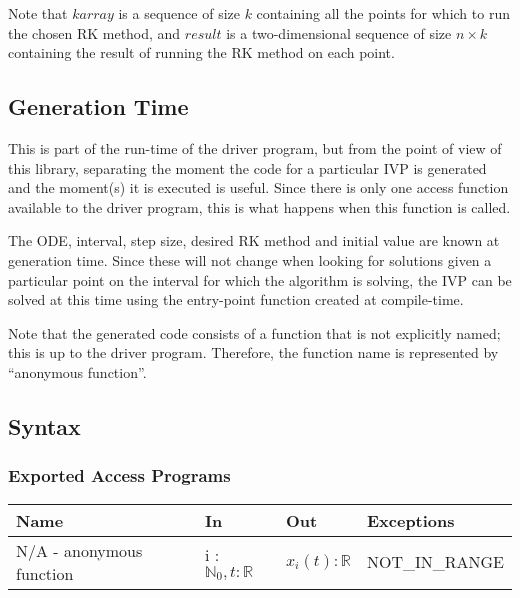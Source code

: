 \documentclass[12pt, titlepage]{article}
\begin{document}
Note that $karray$ is a sequence of size $k$ containing all the points for 
which to run the chosen RK method, and $result$ is a two-dimensional 
sequence of size $n \times k$ containing the result of running the RK method on 
each point.

\subsection{Generation Time}\label{ssec:generation-time}
This is part of the run-time of the driver program, but from the point of view 
of this library, separating the moment the code for a particular IVP is 
generated and the moment(s) it is executed is useful. Since there is only one 
access function available to the driver program, this is what happens when this 
function is called.

The ODE, interval, step size, desired RK method and initial value are known at 
generation time. 
Since these will not change when looking for solutions given a particular point 
on the interval for which the algorithm is solving, the IVP can be solved at 
this time using the entry-point function created at compile-time.

Note that the generated code consists of a function that is not explicitly 
named; this is up to the driver program. Therefore, the function name is 
represented by ``anonymous function''.
\subsection{Syntax}

\subsubsection{Exported Access Programs}

\begin{center}
  \begin{tabular}{p{5cm} p{3cm} p{3cm} p{3cm}}
    \hline
    \textbf{Name} & \textbf{In} & \textbf{Out} & \textbf{Exceptions} \\
    \hline
    N/A - anonymous function & i : $\mathbb{N}_0, t : \mathbb{R}$ & $ x_i(t) : 
    \mathbb{R}$ & NOT\_IN\_RANGE \\
    \hline
  \end{tabular}
\end{center}
\end{document}
